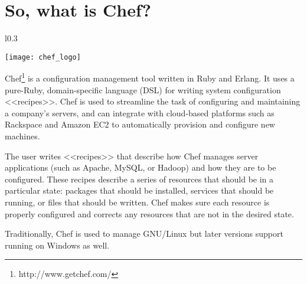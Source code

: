 \chapter{So, what is Chef?}

\begin{wrapfigure}{l}{0.3\textwidth}
  \vspace{-20pt}
  \begin{center}
    \texttt{[image: chef\_logo]}
  \end{center}
  \vspace{-20pt}
\end{wrapfigure}

Chef\footnote{http://www.getchef.com/} is a configuration management tool written in Ruby and Erlang. It uses a pure-Ruby, domain-specific language (DSL) for writing system configuration <<recipes>>. Chef is used to streamline the task of configuring and maintaining a company's servers, and can integrate with cloud-based platforms such as Rackspace and Amazon EC2 to automatically provision and configure new machines.

The user writes <<recipes>> that describe how Chef manages server applications (such as Apache, MySQL, or Hadoop) and how they are to be configured. These recipes describe a series of resources that should be in a particular state: packages that should be installed, services that should be running, or files that should be written. Chef makes sure each resource is properly configured and corrects any resources that are not in the desired state.

Traditionally, Chef is used to manage GNU/Linux but later versions support running on Windows as well.



